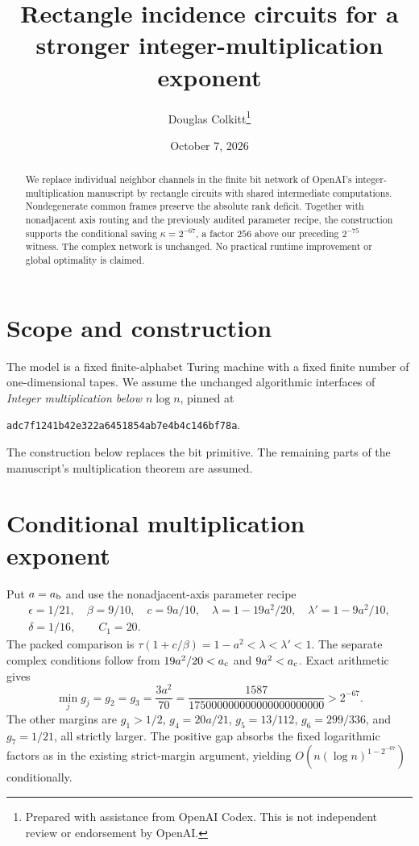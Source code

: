 \documentclass[11pt]{article}
\title{Rectangle incidence circuits for a stronger integer-multiplication exponent}
\author{Douglas Colkitt\thanks{Prepared with assistance from OpenAI Codex.
This is not independent review or endorsement by OpenAI.}}
\date{October 7, 2026}
\begin{document}
\maketitle
\begin{abstract}
We replace individual neighbor channels in the finite bit network of OpenAI's
integer-multiplication manuscript by rectangle circuits with shared intermediate
computations. Nondegenerate common frames preserve the absolute rank deficit.
Together with nonadjacent axis routing and the previously audited parameter
recipe, the construction supports the conditional saving $\kappa=2^{-67}$,
a factor $256$ above our preceding $2^{-75}$ witness. The complex network is
unchanged. No practical runtime improvement or global optimality is claimed.
\end{abstract}

\section{Scope and construction}
The model is a fixed finite-alphabet Turing machine with a fixed finite number
of one-dimensional tapes. We assume the unchanged algorithmic interfaces of
\emph{Integer multiplication below $n\log n$}, pinned at
\begin{center}\texttt{adc7f1241b42e322a6451854ab7e4b4c146bf78a}.\end{center}
The construction below replaces the bit primitive. The remaining parts of
the manuscript's multiplication theorem are assumed.


\section{Conditional multiplication exponent}
Put $a=a_{\rm b}$ and use the nonadjacent-axis parameter recipe
\begin{gather*}
 \epsilon=1/21,\quad \beta=9/10,\quad c=9a/10,\quad
 \lambda=1-19a^2/20,\quad\lambda'=1-9a^2/10,\\
 \delta=1/16,\qquad C_1=20.
\end{gather*}
The packed comparison is $\tau(1+c/\beta)=1-a^2<\lambda<\lambda'<1$.
The separate complex conditions follow from $19a^2/20<a_{\rm c}$ and
$9a^2<a_{\rm c}$. Exact arithmetic gives
\[
 \min_j g_j=g_2=g_3=\frac{3a^2}{70}
 =\frac{1587}{175000000000000000000000}>2^{-67}.
\]
The other margins are $g_1>1/2$, $g_4=20a/21$, $g_5=13/112$,
$g_6=299/336$, and $g_7=1/21$, all strictly larger. The positive gap absorbs
the fixed logarithmic factors as in the existing strict-margin argument,
yielding $O(n(\log n)^{1-2^{-67}})$ conditionally.
\end{document}
